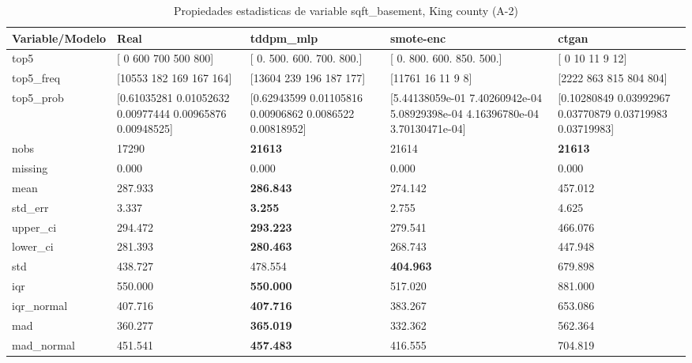 \begin{table}[H]
\centering
\fontsize{8}{14}\selectfont
\caption{Propiedades  estadisticas de variable sqft\_basement, King county (A-2)}
\label{table-stats-king county-a-2-sqft_basement}
\begin{tabular}{|l|m{10em}|m{10em}|m{10em}|m{10em}|}
\hline
 \rowcolor[gray]{0.8}
Variable/Modelo & Real & tddpm\_mlp & smote-enc & ctgan \\
\hline top5 & [  0 600 700 500 800] & [  0. 500. 600. 700. 800.] & [  0. 800. 600. 850. 500.] & [ 0 10 11  9 12] \\
\hline top5\_freq & [10553   182   169   167   164] & [13604   239   196   187   177] & [11761    16    11     9     8] & [2222  863  815  804  804] \\
\hline top5\_prob & [0.61035281 0.01052632 0.00977444 0.00965876 0.00948525] & [0.62943599 0.01105816 0.00906862 0.0086522  0.00818952] & [5.44138059e-01 7.40260942e-04 5.08929398e-04 4.16396780e-04
 3.70130471e-04] & [0.10280849 0.03992967 0.03770879 0.03719983 0.03719983] \\
\hline nobs & 17290 & \bfseries 21613 & \cellcolor[rgb]{0.9, 0.54, 0.52} 21614 & \bfseries 21613 \\
\hline missing & 0.000 & 0.000 & 0.000 & 0.000 \\
\hline mean & 287.933 & \bfseries 286.843 & 274.142 & \cellcolor[rgb]{0.9, 0.54, 0.52} 457.012 \\
\hline std\_err & 3.337 & \bfseries 3.255 & 2.755 & \cellcolor[rgb]{0.9, 0.54, 0.52} 4.625 \\
\hline upper\_ci & 294.472 & \bfseries 293.223 & 279.541 & \cellcolor[rgb]{0.9, 0.54, 0.52} 466.076 \\
\hline lower\_ci & 281.393 & \bfseries 280.463 & 268.743 & \cellcolor[rgb]{0.9, 0.54, 0.52} 447.948 \\
\hline std & 438.727 & 478.554 & \bfseries 404.963 & \cellcolor[rgb]{0.9, 0.54, 0.52} 679.898 \\
\hline iqr & 550.000 & \bfseries 550.000 & 517.020 & \cellcolor[rgb]{0.9, 0.54, 0.52} 881.000 \\
\hline iqr\_normal & 407.716 & \bfseries 407.716 & 383.267 & \cellcolor[rgb]{0.9, 0.54, 0.52} 653.086 \\
\hline mad & 360.277 & \bfseries 365.019 & 332.362 & \cellcolor[rgb]{0.9, 0.54, 0.52} 562.364 \\
\hline mad\_normal & 451.541 & \bfseries 457.483 & 416.555 & \cellcolor[rgb]{0.9, 0.54, 0.52} 704.819 \\

\end{tabular}
\end{table}
